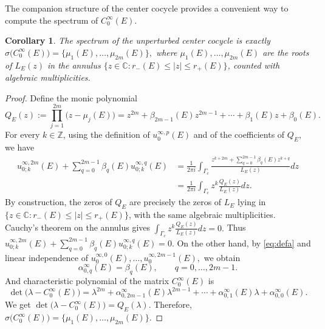 \documentclass[reqno,11pt]{amsart}
\newtheorem{corollary}{Corollary}[section]
\newcommand{\Z}{{\mathbb Z}}
\begin{document}
The companion structure of the center cocycle provides a convenient way to compute the spectrum  of $C_{0}^{\infty}(E)$.
\begin{corollary}\label{cor:zero}
The spectrum of the unperturbed center cocycle is exactly
$
\sigma\bigl(C_{0}^{\infty}(E)\bigr) = \{\mu_{1}(E),\dots,\mu_{2m}(E)\},
$
where $\mu_{1}(E),\dots,\mu_{2m}(E)$ are the roots of $L_{E}(z)$ in the annulus $\{z\in\mathbb{C}: r_-(E) \le |z| \le r_+(E)\}$, counted with algebraic multiplicities.
\end{corollary}
\begin{proof}
Define the monic polynomial
$$
Q_E(z):=\prod_{j=1}^{2m}\bigl(z-\mu_{j}(E)\bigr)=
z^{2m}+\beta_{2m-1}(E)z^{2m-1}+\cdots+\beta_{1}(E)z+\beta_{0}(E).
$$
For every $k\in\Z$, using the definition of $u^{\infty,p}_{0}(E)$ and of the coefficients of
$Q_E$, we have
\begin{align*}
u^{\infty,2m}_{0;k}(E)
+\sum_{q=0}^{2m-1}\beta_{q}(E) u^{\infty,q}_{0;k}(E)
&=\frac{1}{2\pi i}\int_{\Gamma_c}\frac{z^{k+2m}+\sum_{q=0}^{2m-1}\beta_{q}(E)z^{k+q}}{L_{E}(z)} dz\\
&=\frac{1}{2\pi i}\int_{\Gamma_c}z^k \frac{Q_E(z)}{L_{E}(z)} dz.
\end{align*}
By construction, the zeros of $Q_E$ are precisely the zeros of
$L_{E}$ lying in $\{z\in\mathbb C: r_-(E) \le |z| \le r_+(E)\}$, with the same algebraic multiplicities.
 Cauchy's theorem on the annulus gives
$
\int_{\Gamma_c}z^k \frac{Q_E(z)}{L_{E}(z)} dz=0.
$
Thus
$
u^{\infty,2m}_{0;k}(E)+\sum_{q=0}^{2m-1}\beta_{q}(E) u^{\infty,q}_{0;k}(E)=0.
$
On the other hand, by \eqref{eq:defa} and  linear independence of
$
u^{\infty,0}_{0}(E),\dots,u^{\infty,2m-1}_{0}(E),
$
we obtain
$$
\alpha^{\infty}_{0,q}(E)=\beta_{q}(E),
\qquad q=0,\dots,2m-1.
$$
And characteristic polynomial of
the matrix $C_{0}^{\infty}(E)$  is
$$
\det\bigl(\lambda -C_{0}^{\infty}(E)\bigr)
=\lambda^{2m}+\alpha^{\infty}_{0,2m-1}(E)\lambda^{2m-1}
+\cdots+\alpha^{\infty}_{0,1}(E)\lambda+\alpha^{\infty}_{0,0}(E).
$$
 We get
$\det\bigl(\lambda -C_{0}^{\infty}(E)\bigr)=Q_E(\lambda).$
Therefore,
$
\sigma\bigl(C_{0}^{\infty}(E)\bigr)=\{\mu_{1}(E),\dots,\mu_{2m}(E)\}.
$

\end{proof}
\end{document}
